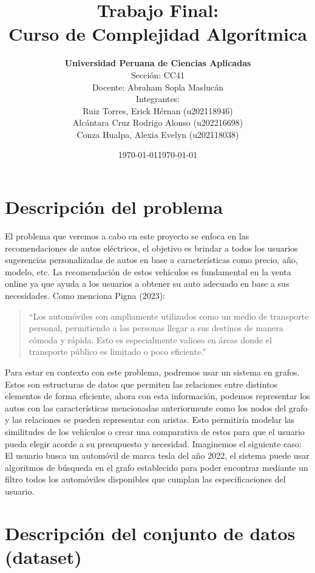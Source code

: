 \documentclass[12pt]{article}
\date{\myformat\today}
\title{\textbf{Trabajo Final:} \\ Curso de Complejidad Algorítmica}
\author{
  \textbf{Universidad Peruana de Ciencias Aplicadas}\\[1ex]
  Sección: CC41 \\
  Docente: Abraham Sopla Maslucán \\[2ex]
  Integrantes: \\
  Ruiz Torres, Erick Hérnan (u202118946) \\
  Alcántara Cruz Rodrigo Alonso (u202216698) \\
  Conza Hualpa, Alexia Evelyn (u202118038)
}
\date{\myformat\today}
\begin{document}
\maketitle
\thispagestyle{empty} 
\newpage 

\tableofcontents
\newpage 

\listoflistings
\newpage



\section{Descripción del problema}
El problema que veremos a cabo en este proyecto se enfoca en las recomendaciones de autos eléctricos, el objetivo es brindar a todos los usuarios sugerencias personalizadas de autos en base a características como precio, año, modelo, etc. La recomendación de estos vehículos es fundamental en la venta online ya que ayuda a los usuarios a obtener su auto adecuado en base a sus necesidades. Como menciona Pigna (2023):

\begin{quote}
“Los automóviles son ampliamente utilizados como un medio de transporte personal, permitiendo a las personas llegar a sus destinos de manera cómoda y rápida. Esto es especialmente valioso en áreas donde el transporte público es limitado o poco eficiente.”
\end{quote}

Para estar en contexto con este problema, podremos usar un sistema en grafos. Estos son estructuras de datos que permiten las relaciones entre distintos elementos de forma eficiente, ahora con esta información, podemos representar los autos con las características mencionadas anteriormente como los nodos del grafo y las relaciones se pueden representar con aristas. Esto permitiría modelar las similitudes de los vehículos o crear una comparativa de estos para que el usuario pueda elegir acorde a su presupuesto y necesidad. Imaginemos el siguiente caso: El usuario busca un automóvil de marca tesla del año 2022, el sistema puede usar algoritmos de búsqueda en el grafo establecido para poder encontrar mediante un filtro todos los automóviles disponibles que cumplan las especificaciones del usuario.


\section{Descripción del conjunto de datos (dataset)}
\end{document}
